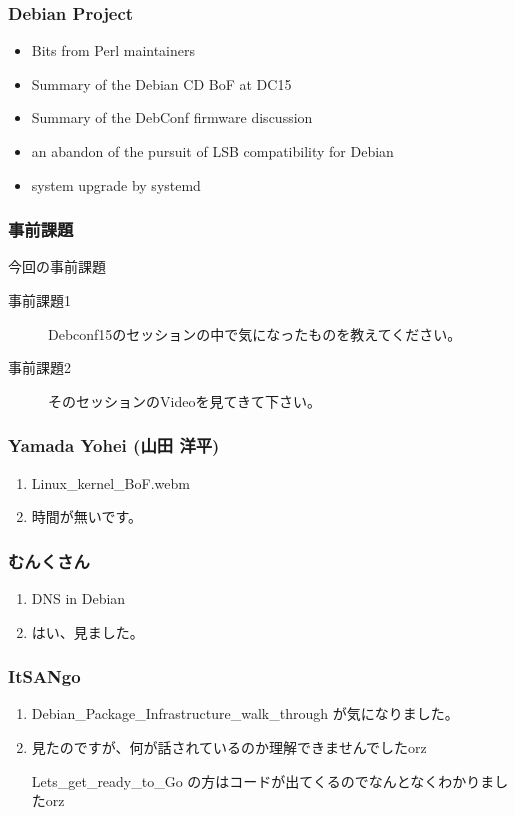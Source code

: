 \documentclass[cjk,dvipdfmx,10pt,compress,%
hyperref={bookmarks=true,bookmarksnumbered=true,bookmarksopen=false,%
colorlinks=false,%
pdftitle={第 102 回 関西 Debian 勉強会},%
pdfauthor={倉敷・のがた・佐々木・かわだ},%
pdfsubject={資料},%
}]{beamer}
\begin{document}
\begin{frame}[fragile]
  \frametitle{Debian Project}
  \begin{itemize}
  \item Bits from Perl maintainers
  \item Summary of the Debian CD BoF at DC15
  \item Summary of the DebConf firmware discussion
  \item an abandon of the pursuit of LSB compatibility for Debian
  \item system upgrade by systemd
  \end{itemize}
\end{frame}



\begin{frame}[fragile]
  \frametitle{事前課題}
  \begin{block}{今回の事前課題}
    \begin{description}
    \item[事前課題1]
      Debconf15のセッションの中で気になったものを教えてください。
    \item[事前課題2]
      そのセッションのVideoを見てきて下さい。
    \end{description}
  \end{block}
\end{frame}


\begin{frame}
  \frametitle{ Yamada Yohei (山田 洋平) }
  \begin{enumerate}
  \item Linux\_kernel\_BoF.webm
  \item 時間が無いです。
  \end{enumerate}
\end{frame}

\begin{frame}
  \frametitle{ むんくさん }
  \begin{enumerate}
  \item DNS in Debian
  \item はい、見ました。
  \end{enumerate}
\end{frame}

\begin{frame}
  \frametitle{ ItSANgo }
  \begin{enumerate}
  \item Debian\_Package\_Infrastructure\_walk\_through が気になりました。
  \item 見たのですが、何が話されているのか理解できませんでしたorz

    Lets\_get\_ready\_to\_Go の方はコードが出てくるのでなんとなくわかりましたorz
  \end{enumerate}
\end{frame}
\end{document}
